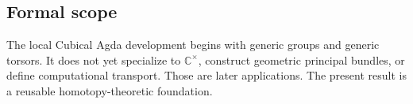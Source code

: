 \subsection{Formal scope}
The local Cubical Agda development begins with generic groups and generic torsors. It does not yet specialize to $\mathbb{C}^{\times}$, construct geometric principal bundles, or define computational transport. Those are later applications. The present result is a reusable homotopy-theoretic foundation.

